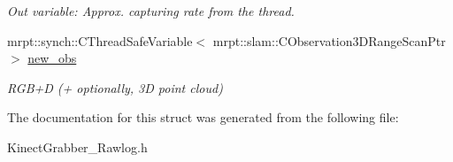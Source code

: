 \begin{DoxyCompactItemize}
\begin{DoxyCompactList}\small\item\em Out variable: Approx. capturing rate from the thread. \item\end{DoxyCompactList}\item 
\hypertarget{struct_kinect_grabber___rawlog_1_1_t_thread_param_a8cf656cbaab31b17e8794674706efa50}{
mrpt::synch::CThreadSafeVariable$<$ mrpt::slam::CObservation3DRangeScanPtr $>$ \hyperlink{struct_kinect_grabber___rawlog_1_1_t_thread_param_a8cf656cbaab31b17e8794674706efa50}{new\_\-obs}}
\label{struct_kinect_grabber___rawlog_1_1_t_thread_param_a8cf656cbaab31b17e8794674706efa50}

\begin{DoxyCompactList}\small\item\em RGB+D (+ optionally, 3D point cloud) \item\end{DoxyCompactList}\end{DoxyCompactItemize}


The documentation for this struct was generated from the following file:\begin{DoxyCompactItemize}
\item 
KinectGrabber\_\-Rawlog.h\end{DoxyCompactItemize}

